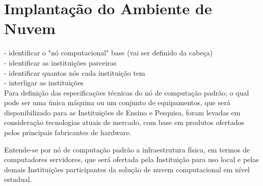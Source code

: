 \documentclass[tese,capa]{texufpel}
\begin{document}


% 

\section{Implantação do Ambiente de Nuvem}

- identificar o "nó computacional" base (vai ser definido da cabeça)\\
- identificar as instituições parceiras\\
- identificar quantos nós cada instituição tem\\
- interligar as instituições\\

Para definição das especificações técnicas do nó de computação padrão, o qual pode ser uma única máquina ou um conjunto de equipamentos, que será disponibilizado para as Instituições de Ensino e Pesquisa, foram levadas em consideração tecnologias atuais de mercado, com base em produtos ofertados pelos principais fabricantes de hardware.

Entende-se por nó de computação padrão a infraestrutura física, em termos de computadores servidores, que será ofertada pela Instituição para uso local e pelas demais Instituições participantes da solução de nuvem computacional em nível estadual.

\end{document}
